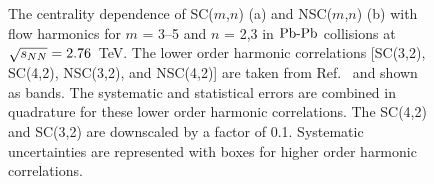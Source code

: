 \begin{figure}[t!]
            \begin{center}
                       \hspace{-0.67cm}
        \caption{The centrality dependence of SC($m$,$n$) (a) and NSC($m$,$n$) (b) with flow harmonics for $m$ = 3--5 and $n$ = 2,3 in $\textnormal{Pb-Pb}$ collisions at $\sqrt{s_{NN}}=2.76$~TeV. The lower order harmonic correlations [SC(3,2), SC(4,2), NSC(3,2), and NSC(4,2)] are taken from Ref.~\cite{ALICE:2016kpq} and shown as bands. The systematic and statistical errors are combined in quadrature for these lower order harmonic correlations. The SC(4,2) and SC(3,2) are downscaled by a factor of 0.1. Systematic uncertainties are represented with boxes for higher order harmonic correlations.}
        \label{fig:Figure_1}
              \end{center}
\end{figure}

